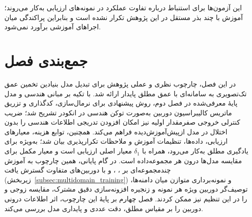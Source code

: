 این آزمون‌ها برای استنباط درباره تفاوت عملکرد در نمونه‌های ارزیابی به‌کار می‌روند؛ آموزش با چند بذر مستقل در این پژوهش تکرار نشده است و بنابراین پراکندگی میان اجراهای آموزشی برآورد نمی‌شود.


\section{جمع‌بندی فصل}
\label{sec:chapter3_summary}

در این فصل، چارچوب نظری و عملی پژوهش برای تبدیل مدل بنیادین تخمین عمق تک‌تصویری به سامانه‌ای با عمق مطلق پایدار ارائه شد. با تکیه بر مبانی هندسی و مدل پایهٔ معرفی‌شده در فصل دوم، روش پیشنهادی برای نرمال‌سازی، کدگذاری و تزریق ماتریس کالیبراسیون دوربین به‌صورت توکن هندسی در انکودر تشریح شد؛ ضریب کنترلی خروجی صفرمقدار اولیه نیز امکان افزودن تدریجی اطلاعات هندسی را بدون اختلال در مدل ازپیش‌آموزش‌دیده فراهم می‌کند. همچنین، توابع هزینه، معیارهای ارزیابی، داده‌ها، تنظیمات آموزش و ملاحظات تکرارپذیری بیان شد؛ به‌ویژه  برای یادگیری مطلق به‌کار می‌رود،  همراه با $\delta_1$ معیار اصلی ارزیابی است و  معیار مکمل برای مقایسه مدل‌ها درون هر مجموعه‌داده است.
در گام پایانی، همین چارچوب به آموزش چندمجموعه‌ای بر ، ،  و  با دوربین‌های متفاوت گسترش یافت (زیربخش~\ref{subsec:multidomain_training}) و نمونه‌برداری متوازن میان دامنه‌ها، توصیف‌گر دوربین ویژه هر نمونه و زنجیره افزونه‌سازی دقیق مشترک، مقایسه زوجی \proposedmodel{} و \controlmodel{} را در این تنظیم نیز ممکن کردند.
فصل چهارم بر پایهٔ این چارچوب، اثر اطلاعات درونی دوربین را بر مقیاس مطلق، دقت عددی و پایداری مدل بررسی می‌کند.

